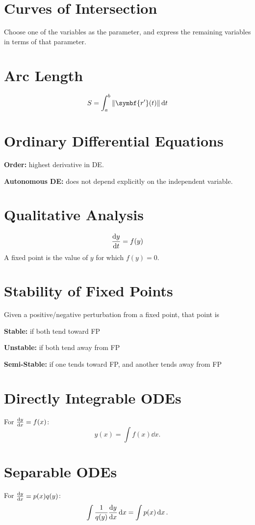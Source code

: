 \documentclass{article}
\begin{document}
\begin{multicols}{3}
    \section*{Curves of Intersection}
    Choose one of the variables as the parameter, and express the remaining variables in terms of that parameter.
    \section*{Arc Length}
    \begin{equation*}
        S = \int_a^b \norm{\symbf{r'}(t)} \dd{t}
    \end{equation*}
    \section*{Ordinary Differential Equations}
    \textbf{Order:} highest derivative in DE.

    \textbf{Autonomous DE:} does not depend explicitly on the independent variable.
    \section*{Qualitative Analysis}
    \begin{equation*}
        \dv{y}{t} = f(y)
    \end{equation*}
    A fixed point is the value of $y$ for which $f(y) = 0$.
    \section*{Stability of Fixed Points}
    Given a positive/negative perturbation from a fixed point, that point is

    \textbf{Stable:} if both tend toward FP

    \textbf{Unstable:} if both tend away from FP

    \textbf{Semi-Stable:} if one tends toward FP, and another tends away from FP
    \section*{Directly Integrable ODEs}
    For $\dv{y}{x} = f(x)$:
    \begin{equation*}
        y(x) = \int f(x) \dd{x}.
    \end{equation*}
    \section*{Separable ODEs}
    For $\dv{y}{x} = p(x) q(y)$:
    \begin{equation*}
        \int \frac{1}{q(y)} \dv{y}{x} \dd{x} = \int p(x) \dd{x}.
    \end{equation*}

\end{multicols}
\end{document}
